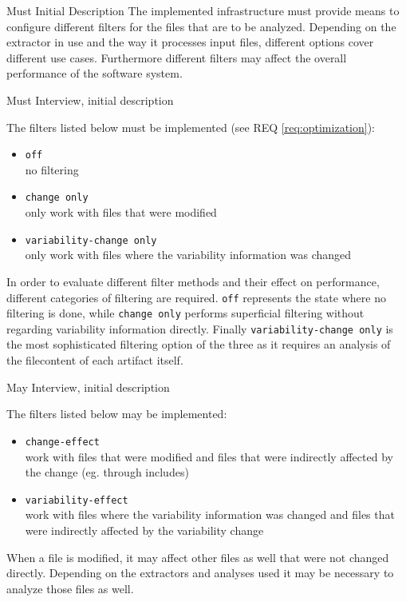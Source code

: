 \documentclass[a4paper]{article}
\begin{document}
\clearpage
\begin{req} \label{req:optimization}
\reqtable
	{Must}  {Initial Description}
	{
	The implemented infrastructure must provide means to configure different filters for the files that are to be analyzed.
    }
	{Depending on the extractor in use and the way it processes input files, different options cover different use cases. Furthermore different filters may affect the overall performance of the software system.}

\begin{subreq}
    \reqtable
	{Must}  {Interview, initial description}
	{
	The filters listed below must be implemented (see REQ \ref{req:optimization}):
	\begin{itemize}
		\item \texttt{off} \\
		no filtering 
	    \item \texttt{change only} \\
	    only work with files that were modified
	    \item \texttt{variability-change only} \\
	     only work with files where the variability information was changed
	\end{itemize}
    }
	{In order to evaluate different filter methods and their effect on performance, different categories of filtering are required. \texttt{off} represents the state where no filtering is done, while \texttt{change only} performs superficial filtering without regarding variability information directly. Finally \texttt{variability-change only} is the most sophisticated filtering option of the three as it requires an analysis of the filecontent of each artifact itself.}
\end{subreq}

\begin{subreq}
    \reqtable
	{May}  {Interview, initial description}
	{
	The filters listed below may be implemented:
	\begin{itemize}
		\item \texttt{change-effect} \\
		work with files that were modified and files that were indirectly affected by the change (eg. through includes)
	    \item \texttt{variability-effect}  \\
	    work with files where the variability information was changed and files that were indirectly affected by the variability change
	\end{itemize}
    }
	{When a file is modified, it may affect other files as well that were not changed directly. Depending on the extractors and analyses used it may be necessary to analyze those files as well.}
\end{subreq}

\end{req}
\end{document}
